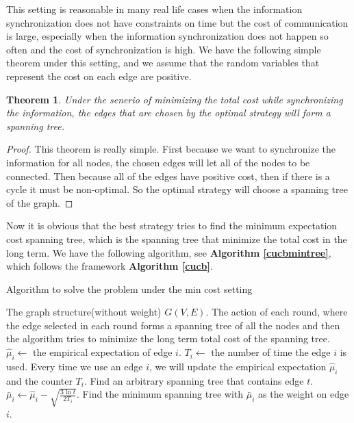 \documentclass{article}
\theoremstyle{plain}
\newtheorem{thm}{Theorem}[section]
\theoremstyle{definition}
\theoremstyle{remark}
\begin{document}
    This setting is reasonable in many real life cases when the information synchronization does not have constraints on time but the cost of communication is large, especially when the information synchronization does not happen so often and the cost of synchronization is high. We have the following simple theorem under this setting, and we assume that the random variables that represent the cost on each edge are positive.\\

    \begin{thm}\label{min-spanning-tree}
        Under the senerio of minimizing the total cost while synchronizing the information, the edges that are chosen by the optimal strategy will form a spanning tree.
    \end{thm}
    \begin{proof}
        This theorem is really simple. First because we want to synchronize the information for all nodes, the chosen edges will let all of the nodes to be connected. Then because all of the edges have positive cost, then if there is a cycle it must be non-optimal. So the optimal strategy will choose a spanning tree of the graph.
    \end{proof}

    Now it is obvious that the best strategy tries to find the minimum expectation cost spanning tree, which is the spanning tree that minimize the total cost in the long term. We have the following algorithm, see \textbf{Algorithm \ref{cucbmintree}}, which follows the framework \textbf{Algorithm \ref{cucb}}.

    \begin{algorithm}
        \caption{Algorithm to solve the problem under the min cost setting}
        \label{cucbmintree}
        \begin{algorithmic}[1]
        \Require The graph structure(without weight) $G(V,E)$.
        \Ensure The action of each round, where the edge selected in each round forms a spanning tree of all the nodes and then the algorithm tries to minimize the long term total cost of the spanning tree.
            \State $\hat \mu_i \leftarrow$ the empirical expectation of edge $i$.
            \State $T_i \leftarrow$ the number of time the edge $i$ is used.
            \State Every time we use an edge $i$, we will update the empirical expectation $\hat \mu_i$ and the counter $T_i$.
                \State Find an arbitrary spanning tree that contains edge $t$.
            \EndFor
                \State $\bar\mu_i \leftarrow \hat\mu_i - \sqrt{\frac{3\ln t}{2T_i}}$.
                \State Find the minimum spanning tree with $\bar\mu_i$ as the weight on edge $i$.
            \EndFor
        \EndProcedure
        \end{algorithmic}
    \end{algorithm}
\end{document}
